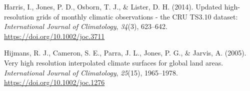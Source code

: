 \documentclass[
]{article}
\begin{document}
\leavevmode\hypertarget{ref-harris_updated_2014}{}%
Harris, I., Jones, P. D., Osborn, T. J., \& Lister, D. H. (2014).
Updated high-resolution grids of monthly climatic observations - the CRU
TS3.10 dataset: \emph{International Journal of Climatology},
\emph{34}(3), 623--642. \url{https://doi.org/10.1002/joc.3711}

\leavevmode\hypertarget{ref-hijmans_very_2005}{}%
Hijmans, R. J., Cameron, S. E., Parra, J. L., Jones, P. G., \& Jarvis,
A. (2005). Very high resolution interpolated climate surfaces for global
land areas. \emph{International Journal of Climatology}, \emph{25}(15),
1965--1978. \url{https://doi.org/10.1002/joc.1276}
\end{document}
